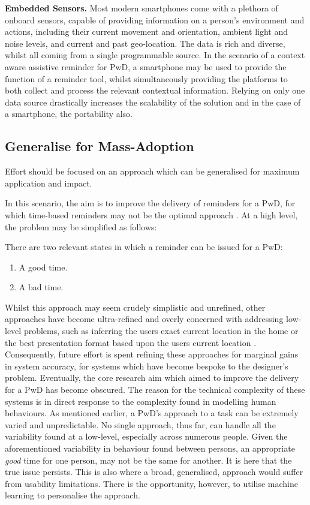 \textbf{Embedded Sensors.}
Most modern smartphones come with a plethora of onboard sensors, capable of providing information on a person's environment and actions, including their current movement and orientation, ambient light and noise levels, and current and past geo-location. The data is rich and diverse, whilst all coming from a single programmable source. In the scenario of a context aware assistive reminder for PwD, a smartphone may be used to provide the function of a reminder tool, whilst simultaneously providing the platforms to both collect and process the relevant contextual information. Relying on only one data source drastically increases the scalability of the solution and in the case of a smartphone, the portability also.

\subsection{Generalise for Mass-Adoption}
Effort should be focused on an approach which can be generalised for maximum application and impact.

In this scenario, the aim is to improve the delivery of reminders for a PwD, for which time-based reminders may not be the optimal approach \cite{Morris2003, Zhou2012, Shulman2015}. At a high level, the problem may be simplified as follows:

There are two relevant states in which a reminder can be issued for a PwD:
\begin{enumerate}[noitemsep,topsep=0pt]
\item A good time.
\item A bad time.
\end{enumerate}

Whilst this approach may seem crudely simplistic and unrefined, other approaches have become ultra-refined and overly concerned with addressing low-level problems, such as inferring the users exact current location in the home \cite{Grunerbl2011} or the best presentation format based upon the users current location \cite{Tang2011}. Consequently, future effort is spent refining these approaches for marginal gains in system accuracy, for systems which have become bespoke to the designer's problem. Eventually, the core research aim which aimed to improve the delivery for a PwD has become obscured. The reason for the technical complexity of these systems is in direct response to the complexity found in modelling human behaviours.  As mentioned earlier, a PwD's approach to a task can be extremely varied and unpredictable. No single approach, thus far, can handle all the variability found at a low-level, especially across numerous people. Given the aforementioned variability in behaviour found between persons, an appropriate \textit{good} time for one person, may not be the same for another. It is here that the true issue persists. This is also where a broad, generalised, approach would suffer from usability limitations. There is the opportunity, however, to utilise machine learning to personalise the approach.


